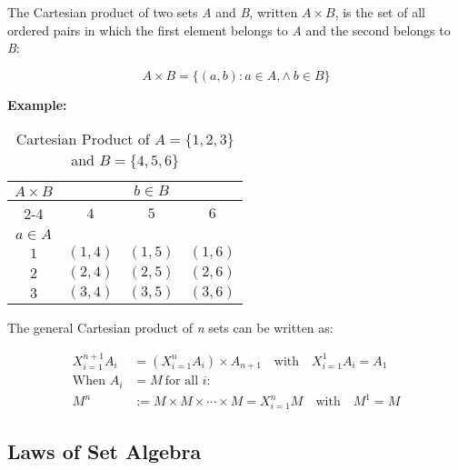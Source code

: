 The Cartesian product of two sets \emph{A} and \emph{B}, written \(A \times B\), is the set of 
all ordered pairs in which the first element belongs to \emph{A} and the second belongs to \emph{B}:

\[
	A \times B = \{ (a, b) : a \in A, \land\ b \in B\}
\]

\textbf{Example:}
\vspace{\baselineskip}

\begin{table}[H]
	\centering
	\caption{Cartesian Product of \(A = \{1, 2, 3\}\) and \(B = \{4, 5, 6\}\)}
	\begin{tabular}{|c|c|c|c|}
		\hline
		\multirow{3}{*}{\(A \times B\)} & \multicolumn{3}{c|}{\(b \in B\)}                       \\
		\cline{2-4}
		                              & \(4\)                            & \(5\)      & \(6\)      \\
		\hline
		\(a \in A\)                     &                                &          &          \\
		\hline
		\(1\)                           & \((1, 4)\)                       & \((1, 5)\) & \((1, 6)\) \\
		\hline
		\(2\)                           & \((2, 4)\)                       & \((2, 5)\) & \((2, 6)\) \\
		\hline
		\(3\)                           & \((3, 4)\)                       & \((3, 5)\) & \((3, 6)\) \\
		\hline
	\end{tabular}
	\label{tab:cartesian_product}
\end{table}

The general Cartesian product of \emph{n} sets can be written as:

\begin{align*}
	X_{i = 1}^{n + 1} A_i & = \left( X_{i = 1}^{n} A_i \right) \times A_{n + 1} \quad \text{with} \quad X_{i = 1}^{1} A_i = A_1 \\
	\text{When } A_i      & = M \ \text{for all } i:                                                                            \\
	M^n                   & := M \times M \times \cdots \times M = X_{i = 1}^{n} M \quad \text{with} \quad M^1 = M
\end{align*}

\subsection{Laws of Set Algebra}

